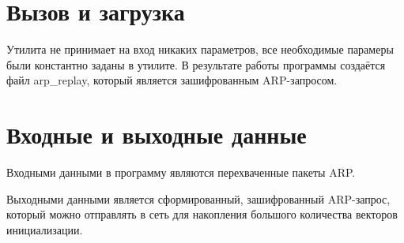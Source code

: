 \section{Вызов и загрузка}

Утилита не принимает на вход никаких параметров, все необходимые парамеры были
константно заданы в утилите. В результате работы программы создаётся файл
arp\_replay, который является зашифрованным ARP-запросом.

\section{Входные и выходные данные}

Входными данными в программу являются перехваченные пакеты ARP.

Выходными данными является сформированный, зашифрованный ARP-запрос, который
можно отправлять в сеть для накопления большого количества векторов
инициализации.
